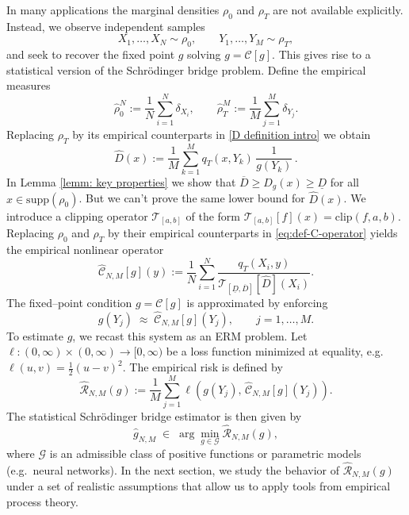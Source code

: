\documentclass[11pt]{article}
\theoremstyle{remark}
\numberwithin{equation}{section}
\DeclareMathOperator*{\supp}{sup}
\def\supp{\mathrm{supp}}
\def\clip{\mathrm{clip}}
\begin{document}
In many applications the marginal densities $\rho_0$ and $\rho_T$ are not
available explicitly. Instead, we observe independent samples
\[
  X_1,\ldots,X_N \sim \rho_0,
  \qquad
  Y_1,\ldots,Y_M \sim \rho_T,
\]
and seek to recover the fixed point $g$ solving $g = \mathcal{C}[g]$. This gives rise to a
statistical version of the Schr\"odinger bridge problem. Define the empirical measures
\[
  \widehat{\rho}_0^N := \frac{1}{N}\sum_{i=1}^N \delta_{X_i},
  \qquad
  \widehat{\rho}_T^M := \frac{1}{M}\sum_{j=1}^M \delta_{Y_j}.
\]
Replacing $\rho_T$ by its empirical counterparts in \eqref{D definition intro} we obtain 
\begin{equation*}
    \widehat D(x):= \frac{1}{M} \sum_{k=1}^M 
          q_T(x, Y_k)\,\frac{1}{g(Y_k)} \, .
\end{equation*}
In Lemma \ref{lemm: key properties} we show that $\overline{D} \geq D_g(x) \geq \underline{D}$ for all $x \in \supp(\rho_0)$. But we can't prove the same lower bound for $\widehat D(x)$. We introduce a clipping operator $\mathcal{T}_{[a,b]}$  of the form 
$\mathcal{T}_{[a,b]}[f](x) = \clip(f, a, b)$.
Replacing $\rho_0$ and $\rho_T$ by their empirical counterparts in
\eqref{eq:def-C-operator} yields the empirical nonlinear operator
\begin{equation}\label{eq:empirical-C}
  \widehat{\mathcal{C}}_{N,M}[g](y)
  :=
  \frac{1}{N}\sum_{i=1}^N
     \frac{
        q_T(X_i, y)
     }{
       \mathcal{T}_{[\underline{D},\overline{D}]}[\widehat D](X_i)
     }.
\end{equation}
The fixed--point condition $g = \mathcal{C}[g]$ is approximated by enforcing
\[
  g(Y_j) \;\approx\; \widehat{\mathcal{C}}_{N,M}[g](Y_j),
  \qquad j = 1,\dots,M.
\]
To estimate $g$, we recast this system as an ERM
problem. Let $\ell:(0,\infty)\times(0,\infty)\to[0,\infty)$ be a loss function
minimized at equality, e.g. $\ell(u,v)=\tfrac12(u-v)^2$. The empirical risk is defined by
\begin{equation}\label{eq:empirical-risk}
  \widehat{\mathcal{R}}_{N,M}(g)
  :=
  \frac{1}{M}\sum_{j=1}^M
  \ell\!\left(
      g(Y_j),\,
      \widehat{\mathcal{C}}_{N,M}[g](Y_j)
  \right).
\end{equation}
The statistical Schr\"odinger bridge estimator is then given by
\begin{equation}\label{eq:erm-problem}
  \widehat{g}_{N,M}
  \;\in\;
  \arg\min_{g\in\mathcal{G}}
  \widehat{\mathcal{R}}_{N,M}(g),
\end{equation}
where $\mathcal{G}$ is an admissible class of positive functions or
parametric models (e.g.\ neural networks). In the next section, we study the behavior of $\widehat{\mathcal{R}}_{N,M}(g)$ under a set of realistic assumptions that allow us to apply tools from empirical process theory.
\end{document}

